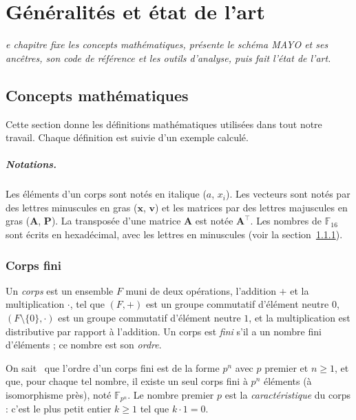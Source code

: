 \let\textcircled=\pgftextcircled
\chapter[Généralités et état de l'art]{Généralités et état de l'art}
\label{ch:etat}

\bigskip

\textit{e chapitre fixe les concepts mathématiques, présente le schéma MAYO et ses ancêtres, son code de référence et les outils d'analyse, puis fait l'état de l'art.}

\newpage


\section{Concepts mathématiques}\label{sec:maths}
Cette section donne les définitions mathématiques utilisées dans tout notre travail. Chaque définition est suivie d'un exemple calculé.

\paragraph{Notations.} Les éléments d'un corps sont notés en italique ($a$, $x_i$). Les vecteurs sont notés par des lettres minuscules en gras ($\mathbf{x}$, $\mathbf{v}$) et les matrices par des lettres majuscules en gras ($\mathbf{A}$, $\mathbf{P}$). La transposée d'une matrice $\mathbf{A}$ est notée $\mathbf{A}^{\top}$. Les nombres de $\mathbb{F}_{16}$ sont écrits en hexadécimal, avec les lettres en minuscules (voir la section~\ref{sec:corps}).

\subsection{Corps fini}\label{sec:corps}
\begin{definition}
Un \emph{corps} est un ensemble $F$ muni de deux opérations, l'addition $+$ et la multiplication $\cdot$, tel que $(F,+)$ est un groupe commutatif d'élément neutre $0$, $(F\setminus\{0\},\cdot)$ est un groupe commutatif d'élément neutre $1$, et la multiplication est distributive par rapport à l'addition. Un corps est \emph{fini} s'il a un nombre fini d'éléments ; ce nombre est son \emph{ordre}.
\end{definition}
On sait~\cite{lidl} que l'ordre d'un corps fini est de la forme $p^n$ avec $p$ premier et $n\ge1$, et que, pour chaque tel nombre, il existe un seul corps fini à $p^n$ éléments (à isomorphisme près), noté $\mathbb{F}_{p^n}$. Le nombre premier $p$ est la \emph{caractéristique} du corps : c'est le plus petit entier $k\ge1$ tel que $k\cdot1=0$.

